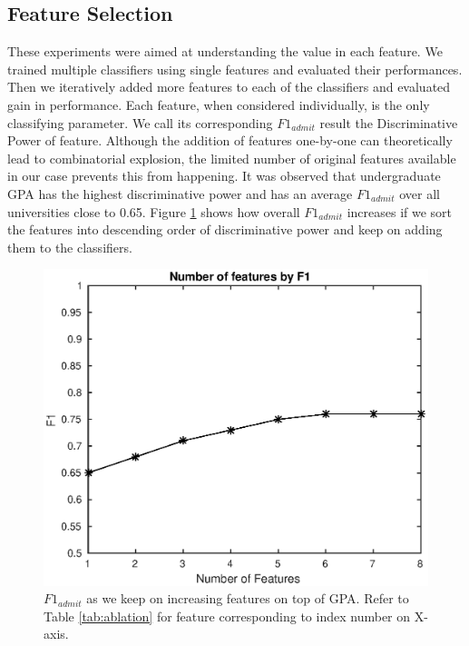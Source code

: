 \documentclass{sig-alternate-05-2015}
\begin{document}
\subsection{Feature Selection}
\label{subsec:ablation-exp}
These experiments were aimed at understanding the value in each feature. We trained multiple classifiers using single features and evaluated their performances. Then we iteratively added more features to each of the classifiers and evaluated gain in performance. Each feature, when considered individually, is the only classifying parameter. We call its corresponding $F1_{admit}$ result the Discriminative Power of feature. Although the addition of features one-by-one can theoretically lead to combinatorial explosion, the limited number of original features available in our case prevents this from happening. It was observed that undergraduate GPA has the highest discriminative power and has an average $F1_{admit}$ over all universities close to 0.65. Figure \ref{fig:ablation} shows how overall $F1_{admit}$ increases if we sort the features into descending order of discriminative power and keep on adding them to the classifiers.

\begin{figure}[t]
\centering
\includegraphics[scale=0.6]{ablation.eps}
\caption{$F1_{admit}$ as we keep on increasing features on top of GPA. Refer to Table \ref{tab:ablation} for feature corresponding to index number on X-axis.}
\label{fig:ablation}
\end{figure}
\end{document}
